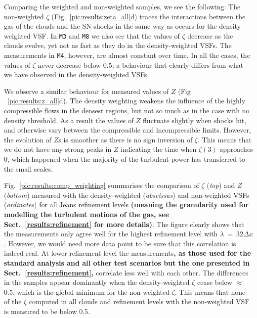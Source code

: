 Comparing the weighted and non-weighted samples, we see the following:
The non-weighted $\zeta$ (Fig.~\ref{pic:results:zeta_all}d) 
traces the interactions between the gas of the clouds and the SN shocks in the same way as occurs for the density-weighted VSF.
In \texttt{M3} and \texttt{M8} we also see that the values of $\zeta$ decrease as the clouds evolve, yet not as fast as they do in the density-weighted VSFs. 
The measurements in \texttt{M4}, however, are almost constant over time. 
In all the cases, the values of $\zeta$ never 
     decrease
below 0.5; a behaviour that clearly differs from what we have observed in the density-weighted VSFs. 

We observe a similar behaviour for measured values of $Z$
    (Fig ~\ref{pic:results:z_all}d). 
    The density weighting weakens the influence of the highly compressible flows in the 
    densest regions, but not so much as in the case with no density threshold.  As a result 
    the values of $Z$ fluctuate slightly when shocks hit, and otherwise vary between 
    the compressible and incompressible limits.
However, the evolution of $Z$s is smoother as there is no sign inversion of $\zeta$.
This means that we do not have any strong peaks in $Z$ indicating the time when $\zeta(3)$ approaches 0, which happened when the majority of the turbulent power has transferred to the small scales. 

Fig.~\ref{pic:results:comp_weighting} summarises the comparison of $\zeta$ (\textit{top}) and $Z$ (\textit{bottom}) measured with the density-weighted (\textit{abscissas}) and non-weighted VSFs (\textit{ordinates}) for all Jeans refinement levels \textbf{(meaning the granularity used for modelling the turbulent motions of the gas, see Sect.~\ref{results:refinement} for more details)}.
The figure clearly shows that the measurements only agree well for the highest refinement level with $\lambda~=~32\Delta x$.
However, we would need more data point to be sure that this correlation is indeed real.
At lower refinement level the measurements\textbf{, as those used for the standard analysis and all other test scenarios but the one presented in Sect.~\ref{results:refinement},} correlate less well with each other. 
The differences in the samples appear dominantly when the density-weighted $\zeta$ cease below $\approx$0.5, which is the global minimum for the non-weighted $\zeta$. 
This means that none of the $\zeta$ computed in all clouds and refinement levels with the non-weighted VSF is measured to be below 0.5. 


